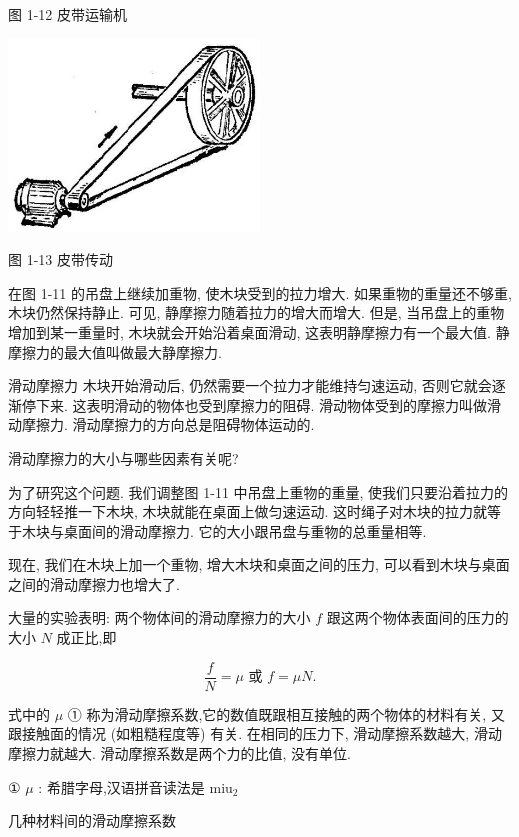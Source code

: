 \documentclass[10pt]{article}
\begin{document}
图 1-12 皮带运输机

\begin{center}
\includegraphics[max width=0.5\textwidth]{images/01912d55-147c-70aa-b0e0-1782a122f948_25_374012.jpg}
\end{center}

图 1-13 皮带传动

在图 1-11 的吊盘上继续加重物, 使木块受到的拉力增大. 如果重物的重量还不够重, 木块仍然保持静止. 可见, 静摩擦力随着拉力的增大而增大. 但是, 当吊盘上的重物增加到某一重量时, 木块就会开始沿着桌面滑动, 这表明静摩擦力有一个最大值. 静摩擦力的最大值叫做最大静摩擦力.

滑动摩擦力 木块开始滑动后, 仍然需要一个拉力才能维持匀速运动, 否则它就会逐渐停下来. 这表明滑动的物体也受到摩擦力的阻碍. 滑动物体受到的摩擦力叫做滑动摩擦力. 滑动摩擦力的方向总是阻碍物体运动的.

滑动摩擦力的大小与哪些因素有关呢?

为了研究这个问题. 我们调整图 1-11 中吊盘上重物的重量, 使我们只要沿着拉力的方向轻轻推一下木块, 木块就能在桌面上做匀速运动. 这时绳子对木块的拉力就等于木块与桌面间的滑动摩擦力. 它的大小跟吊盘与重物的总重量相等.

现在, 我们在木块上加一个重物, 增大木块和桌面之间的压力, 可以看到木块与桌面之间的滑动摩擦力也增大了.

大量的实验表明: 两个物体间的滑动摩擦力的大小 \(f\) 跟这两个物体表面间的压力的大小 \(N\) 成正比,即

\[
\frac{f}{N} = \mu \text{ 或 }f = {\mu N}.
\]

式中的 \(\mu\) ① 称为滑动摩擦系数,它的数值既跟相互接触的两个物体的材料有关, 又跟接触面的情况 (如粗糙程度等) 有关. 在相同的压力下, 滑动摩擦系数越大, 滑动摩擦力就越大. 滑动摩擦系数是两个力的比值, 没有单位.

① \(\mu\) : 希腊字母,汉语拼音读法是 \({\mathrm{{miu}}}_{2}\)

几种材料间的滑动摩擦系数

\begin{center}
\end{center}
\end{document}
